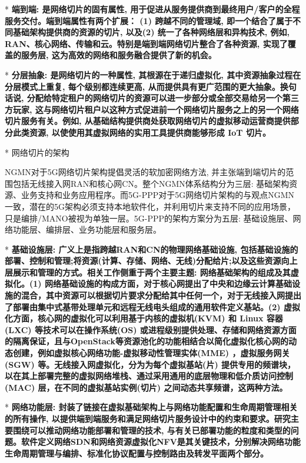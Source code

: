         * \bf{端到端}: 是网络切片的固有属性, 用于促进从服务提供商到最终用户/客户的全程服务交付。端到端属性有两个扩展： (1) 跨越不同的管理域, 即一个结合了属于不同基础架构提供商的资源的切片, 以及(2) 统一了各种网络层和异构技术, 例如, RAN、核心网络、传输和云。特别是端到端网络切片整合了各种资源, 实现了覆盖的服务层, 这为高效的网络和服务融合提供了新的机会。

        * \bf{分层抽象}: 是网络切片的一种属性, 其根源在于递归虚拟化, 其中资源抽象过程在分层模式上重复, 每个级别都连续更高, 从而提供具有更广范围的更大抽象。换句话说, 分配给特定租户的网络切片的资源可以进一步部分或全部交易给另一个第三方玩家, 这与网络切片租户以这种方式促进前一个网络切片服务之上的另一个网络切片服务有关。例如, 从基础结构提供商处获取网络切片的虚拟移动运营商提供部分此类资源, 以使使用其虚拟网络的实用工具提供商能够形成 IoT 切片。


* 网络切片的架构

    NGMN对于5G网络切片架构提倡灵活的软加密网络方法, 并主张端到端切片的范围包括无线接入网RAN和核心网CN。整个NGMN体系结构分为三层: 基础架构资源、业务支持和业务应用程序。而5G-PPP对于5G网络切片架构的与观点NGMN一致，潜在的5G架构必须支持本地软件化，并利用切片来支持不同的应用场景，只是编排/MANO被视为单独一层。5G-PPP的架构方案分为五层: 基础设施层、网络功能层、编排层、业务功能层和服务层。

    * \bf{基础设施层}: 广义上是指跨越RAN和CN的物理网络基础设施, 包括基础设施的部署、控制和管理;将资源(计算、存储、网络、无线)分配给片;以及这些资源向上层展示和管理的方式。相关工作侧重于两个主要主题: 网络基础架构的组成及其虚拟化。(1) 网络基础设施的构成方面，对于核心网提出了中央和边缘云计算基础设施的混合，其中资源可以根据切片要求分配给其中任何一个，对于无线接入网提出了部署由集中式基带处理单元和远程无线电头组成的通用软件定义基站。(2) 虚拟化方面，核心网的虚拟化可以利用基于内核的虚拟机(KVM) 和 Linux 容器(LXC) 等技术可以在操作系统(OS) 或进程级别提供处理、存储和网络资源方面的隔离保证，且与OpenStack等资源池化的功能相结合以简化虚拟化核心网的动态创建，例如虚拟核心网络功能-虚拟移动性管理实体(MME) ，虚拟服务网关(SGW) 等。无线接入网虚拟化，分为为每个虚拟基站(片) 提供专用的频谱块，以在其上部署完整的虚拟网络堆栈、通过采用通用的底层物理和低介质访问控制 (MAC)  层，在不同的虚拟基站实例(切片) 之间动态共享频谱，这两种方法。

    * \bf{网络功能层}: 封装了链接在虚拟基础架构上与网络功能配置和生命周期管理相关的所有操作, 以提供端到端服务和满足网络切片服务设计中的约束和要求。研究主要围绕可以推动网络功能部署和管理的技术, 与有关已部署功能的粒度和类型的问题。软件定义网络SDN和网络资源虚拟化NFV是其关键技术，分别解决网络功能生命周期管理与编排、标准化协议配置与控制路由及转发平面两个部分。

